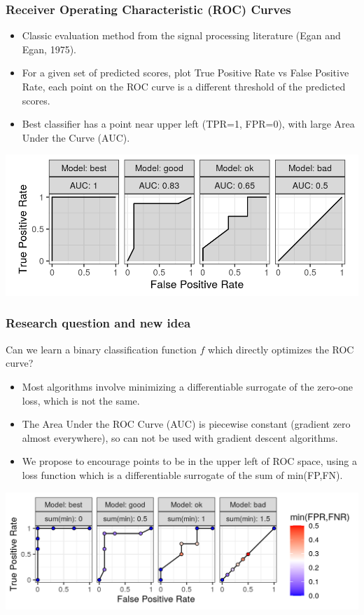 \documentclass[t]{beamer}
\begin{document}
\begin{frame}
  \frametitle{Receiver Operating Characteristic (ROC) Curves}
  \begin{itemize}
  \item Classic evaluation method from the signal processing
    literature (Egan and Egan, 1975).
  \item For a given set of predicted scores, plot True Positive Rate
    vs False Positive Rate, each point on the ROC curve is a different
    threshold of the predicted scores.
  \item Best classifier has a point near upper left (TPR=1, FPR=0), with large
    Area Under the Curve (AUC).
  \end{itemize}
  \includegraphics[width=\textwidth]{figure-more-than-one-binary}
\end{frame}

\begin{frame}
  \frametitle{Research question and new idea}
  Can we learn a binary classification function $f$ which directly
  optimizes the ROC curve?
  \begin{itemize}
  \item Most algorithms involve minimizing a differentiable surrogate
    of the zero-one loss, which is not the same.
  \item The Area Under the ROC Curve (AUC) is piecewise constant
    (gradient zero almost everywhere), so can not be used with
    gradient descent algorithms.
  \item We propose to encourage points to be in the upper left of ROC
    space, using a loss function which is a differentiable surrogate
    of the sum of min(FP,FN).
  \end{itemize}
  \includegraphics[width=\textwidth]{figure-more-than-one-binary-dots}
\end{frame}
\end{document}
